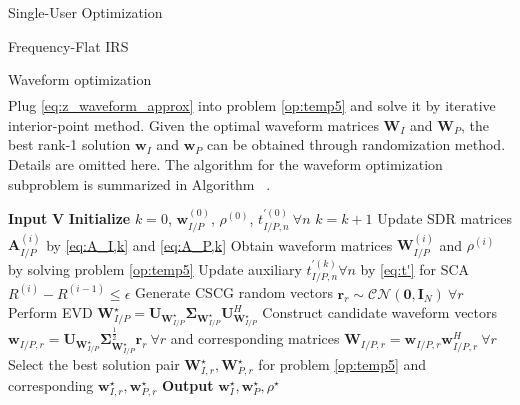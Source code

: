 \documentclass{IEEEtran}
\begin{document}
\begin{section}{Single-User Optimization}
\begin{subsection}{Frequency-Flat IRS}
\begin{subsubsection}{Waveform optimization}
\begin{equation}
\begin{split}
				\end{split}
			\end{equation}
			Plug \ref{eq:z_waveform_approx} into problem \ref{op:temp5} and solve it by iterative interior-point method. Given the optimal waveform matrices $\boldsymbol{W}_I$ and $\boldsymbol{W}_P$, the best rank-1 solution $\boldsymbol{w}_I$ and $\boldsymbol{w}_P$ can be obtained through randomization method. Details are omitted here. The algorithm for the waveform optimization subproblem is summarized in Algorithm ~.

			\begin{algorithm}
				\caption{Waveform Optimization}
				\label{alg:waveform}
				\begin{algorithmic}[1]
					\State \textbf{Input} $\boldsymbol{V}$
					\State \textbf{Initialize} $k=0$, $\boldsymbol{w}_{I/P}^{(0)}$, $\rho^{(0)}$, $t_{I/P,n}^{\prime (0)} \ \forall n$
					\Repeat
					\State $k = k + 1$
					\State Update SDR matrices $\boldsymbol{A}_{I/P}^{(i)}$ by \ref{eq:A_I,k} and \ref{eq:A_P,k}
					\State Obtain waveform matrices $\boldsymbol{W}_{I/P}^{(i)}$ and $\rho^{(i)}$ by solving problem \ref{op:temp5}
					\State Update auxiliary $t_{I/P,n}^{\prime (k)} \forall n$ by \ref{eq:t'} for SCA
					\Until $R^{(i)}-R^{(i-1)} \le \epsilon$
					\State Generate CSCG random vectors $\boldsymbol{r}_r \sim \mathcal{CN}(\boldsymbol{0},\boldsymbol{I}_{N}) \ \forall r$
					\State Perform EVD $\boldsymbol{W}_{I/P}^{\star}=\boldsymbol{U}_{\boldsymbol{W}_{I/P}^{\star}}\boldsymbol{\Sigma}_{\boldsymbol{W}_{I/P}^{\star}}\boldsymbol{U}_{\boldsymbol{W}_{I/P}^{\star}}^H$
					\State Construct candidate waveform vectors $\boldsymbol{w}_{I/P,r}=\boldsymbol{U}_{\boldsymbol{W}_{I/P}^{\star}}\boldsymbol{\Sigma}_{\boldsymbol{W}_{I/P}^{\star}}^{\frac{1}{2}}\boldsymbol{r}_r \ \forall r$ and corresponding matrices $\boldsymbol{W}_{I/P,r}=\boldsymbol{w}_{I/P,r}\boldsymbol{w}_{I/P,r}^H  \ \forall r$
					\State Select the best solution pair $\boldsymbol{W}_{I,r}^\star, \boldsymbol{W}_{P,r}^\star$ for problem \ref{op:temp5} and corresponding $\boldsymbol{w}_{I,r}^\star, \boldsymbol{w}_{P,r}^\star$
					\State \textbf{Output} $\boldsymbol{w}_I^\star, \boldsymbol{w}_P^\star, \rho^\star$
				\end{algorithmic}
			\end{algorithm}
		\end{subsubsection}



\end{subsection}
\end{section}
\end{document}
